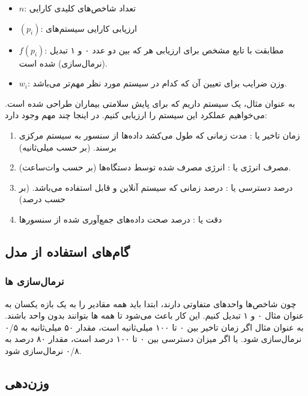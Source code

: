 \documentclass[a4paper]{article}
\begin{document}
\label{compareIoTSystems}

\begin{itemize}
    \item $n$: تعداد شاخص‌های کلیدی کارایی
    \item $(p_i)$: ارزیابی کارایی سیستم‌های 
    \item $f(p_i)$: مطابقت با تابع  مشخص برای ارزیابی هر  که
    بین دو عدد ۰ و ۱ تبدیل (نرمال‌سازی) شده است.
    \item $w_i$: وزن ضرایب برای تعیین آن که کدام  در سیستم  مورد
    نظر مهم‌تر می‌باشد.
\end{itemize}

به عنوان مثال، یک سیستم  داریم که برای پایش سلامتی بیماران طراحی شده
است. می‌خواهیم عملکرد این سیستم را ارزیابی کنیم. در اینجا چند  مهم وجود
دارد:

\begin{enumerate}
    \item زمان تاخیر یا : مدت زمانی که طول می‌کشد داده‌ها از سنسور
    به سیستم مرکزی برسند. (بر حسب میلی‌ثانیه)
    \item مصرف انرژی یا : انرژی مصرف شده توسط دستگاه‌ها
    (بر حسب وات‌ساعت).
    \item درصد دسترسی یا : درصد زمانی که سیستم آنلاین و قابل
    استفاده می‌باشد. (بر حسب درصد)
    \item دقت یا : درصد صحت داده‌های جمع‌آوری شده از سنسور‌ها
\end{enumerate}

\subsection*{گام‌های استفاده از مدل}

\subsubsection*{نرمال‌سازی ها}

چون شاخص‌ها واحد‌های متفاوتی دارند، ابتدا باید همه مقادیر را به یک بازه یکسان به
عنوان مثال ۰ و ۱ تبدیل کنیم. این کار باعث می‌شود تا همه ها بتوانند بدون
واحد باشند. به عنوان مثال اگر زمان تاخیر بین ۰ تا ۱۰۰ میلی‌ثانیه است، مقدار ۵۰
میلی‌ثانیه به ۰/۵ نرمال‌سازی شود. یا اگر میزان دسترسی بین ۰ تا ۱۰۰ درصد است،
مقدار ۸۰ درصد به ۰/۸ نرمال‌سازی شود.

\subsection*{وزن‌دهی}
\end{document}
